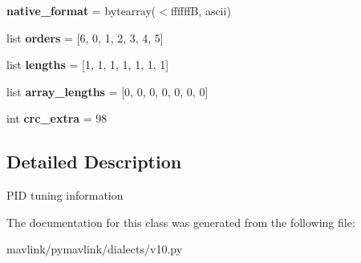 \begin{DoxyCompactItemize}
\item 
\mbox{\label{classpymavlink_1_1dialects_1_1v10_1_1MAVLink__pid__tuning__message_a7567fa5e652e6619c1251d07a7bf644c}} 
{\bfseries native\+\_\+format} = bytearray(\textquotesingle{}$<$ffffffB\textquotesingle{}, \textquotesingle{}ascii\textquotesingle{})
\item 
\mbox{\label{classpymavlink_1_1dialects_1_1v10_1_1MAVLink__pid__tuning__message_a56cce67182b20e6f29909f7ef2367b5a}} 
list {\bfseries orders} = \mbox{[}6, 0, 1, 2, 3, 4, 5\mbox{]}
\item 
\mbox{\label{classpymavlink_1_1dialects_1_1v10_1_1MAVLink__pid__tuning__message_af18281585c9105544e0817a68d0d3191}} 
list {\bfseries lengths} = \mbox{[}1, 1, 1, 1, 1, 1, 1\mbox{]}
\item 
\mbox{\label{classpymavlink_1_1dialects_1_1v10_1_1MAVLink__pid__tuning__message_aeb8a7af0b88d12f936d8e77d396aa619}} 
list {\bfseries array\+\_\+lengths} = \mbox{[}0, 0, 0, 0, 0, 0, 0\mbox{]}
\item 
\mbox{\label{classpymavlink_1_1dialects_1_1v10_1_1MAVLink__pid__tuning__message_af94a7a89c6e4b9b06e56211c484d30b3}} 
int {\bfseries crc\+\_\+extra} = 98
\end{DoxyCompactItemize}


\subsection{Detailed Description}
\begin{DoxyVerb}PID tuning information
\end{DoxyVerb}
 

The documentation for this class was generated from the following file\+:\begin{DoxyCompactItemize}
\item 
mavlink/pymavlink/dialects/v10.\+py\end{DoxyCompactItemize}
